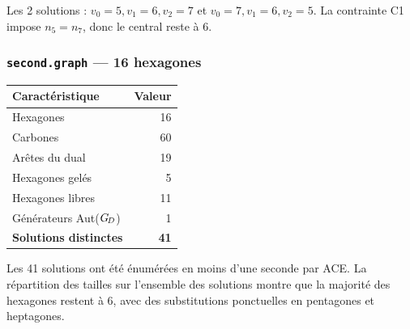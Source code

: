 Les 2 solutions : $v_0 = 5, v_1 = 6, v_2 = 7$ et $v_0 = 7, v_1 = 6, v_2 = 5$.
La contrainte C1 impose $n_5 = n_7$, donc le central reste à 6.

\subsubsection{\texttt{second.graph} — 16 hexagones}

\begin{center}
\begin{tabular}{lr}
  \toprule
  Caractéristique & Valeur \\
  \midrule
  Hexagones & 16 \\
  Carbones & 60 \\
  Arêtes du dual & 19 \\
  Hexagones gelés & 5 \\
  Hexagones libres & 11 \\
  Générateurs Aut($G_{\!D}$) & 1 \\
  \textbf{Solutions distinctes} & \textbf{41} \\
  \bottomrule
\end{tabular}
\end{center}

Les 41 solutions ont été énumérées en moins d'une seconde par ACE. La répartition des
tailles sur l'ensemble des solutions montre que la majorité des hexagones restent à 6, avec
des substitutions ponctuelles en pentagones et heptagones.
